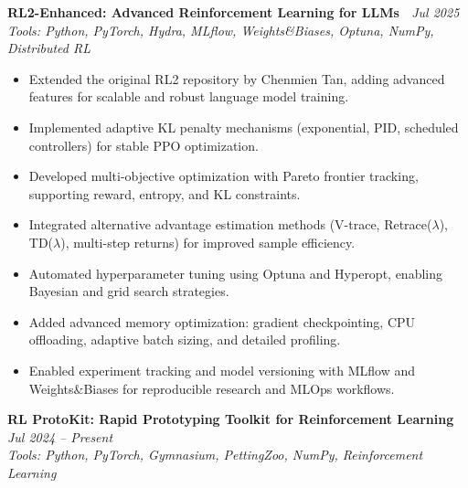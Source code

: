\documentclass[a4paper,10pt]{article}
\newcommand{\resumeItemListStart}{\begin{itemize}[leftmargin=*,labelsep=1mm,itemsep=0.5mm]}
\newcommand{\resumeItemListEnd}{\end{itemize}\vspace{-2mm}}
\newcommand{\resumeheading}[4]{%
  \item[] \textbf{#1} \hfill \textit{\footnotesize{#4}} \\%
  \textit{\footnotesize{#3}} \\%
  \vspace{-2mm}%
}
\begin{document}
\vspace{2.5mm}

\resumeheading
  {RL2-Enhanced: Advanced Reinforcement Learning for LLMs~%
    \href{https://github.com/ch33nchan/rl2.0.1}{\textcolor{darkblue}{\faGithub}}
  }
  {}
  {Tools: Python, PyTorch, Hydra, MLflow, Weights\&Biases, Optuna, NumPy, Distributed RL}
  {Jul 2025}

\vspace{0.5mm}

\resumeItemListStart
  \item Extended the original RL2 repository by Chenmien Tan, adding advanced features for scalable and robust language model training.
  \item Implemented adaptive KL penalty mechanisms (exponential, PID, scheduled controllers) for stable PPO optimization.
  \item Developed multi-objective optimization with Pareto frontier tracking, supporting reward, entropy, and KL constraints.
  \item Integrated alternative advantage estimation methods (V-trace, Retrace($\lambda$), TD($\lambda$), multi-step returns) for improved sample efficiency.
  \item Automated hyperparameter tuning using Optuna and Hyperopt, enabling Bayesian and grid search strategies.
  \item Added advanced memory optimization: gradient checkpointing, CPU offloading, adaptive batch sizing, and detailed profiling.
  \item Enabled experiment tracking and model versioning with MLflow and Weights\&Biases for reproducible research and MLOps workflows.
\resumeItemListEnd

\vspace{2.5mm}



\resumeheading
  {RL ProtoKit: Rapid Prototyping Toolkit for Reinforcement Learning~%
    \href{https://github.com/ch33nchan/rl-prokit}{\textcolor{darkblue}{\faGithub}}
  }
  {}
  {Tools: Python, PyTorch, Gymnasium, PettingZoo, NumPy, Reinforcement Learning}
  {Jul 2024 -- Present}

\vspace{0.5mm}
\end{document}
